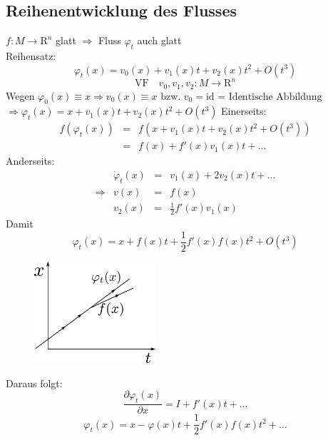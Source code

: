 \documentclass[ngerman]{tudscrreprt}
\begin{document}
\subsection*{Reihenentwicklung des Flusses}
$f: M \to \mathrm{R}^n $ glatt $\Rightarrow$ Fluss $\varphi_t$ auch glatt \\ 
Reihensatz: 
\begin{equation*}
\varphi_t(x) = v_0 (x) + v_1(x)t + v_2(x)t^2 + O(t^3)
\end{equation*}
\begin{equation*}
\text{VF} \quad v_0, v_1, v_2: M \to \mathrm{R}^n
\end{equation*}
Wegen $\varphi_0(x) \equiv x \Rightarrow v_0(x) \equiv x$ bzw. $v_0 = \text{id = Identische Abbildung}$
\\ $\Rightarrow \varphi_t(x) = x + v_1 (x)t + v_2(x)t^2 + O(t^3)  $
Einerseits: \begin{equation*} 
\begin{matrix}
f(\varphi_t(x)) &=& f(x+ v_1(x)t + v_2(x)t^2 + O(t^3)  )\\ 
&=&f(x)+ f'(x) v_1(x) t + \dots   
\end{matrix}
\end{equation*}
Anderseits: \begin{equation*}
\begin{matrix}
&\dot{\varphi}_t(x) &=& v_1(x) + 2v_2(x) t + \dots \\ 
\Rightarrow &v(x) &=& f(x)\\ 
&v_2(x) &=& \frac{1}{2}f'(x) v_1(x)
\end{matrix}
\end{equation*}
Damit \begin{equation*}
\varphi_t(x) = x + f(x) t + \frac{1}{2}f'(x) f(x)t^2 + O(t^3)\tag{2.3}
\end{equation*}
\begin{figure}[H]
\centering
\def\svgwidth{200pt} 
  \includegraphics[width=4.5cm]{image4.pdf}
\end{figure}
Daraus folgt: 
\begin{equation*}
\frac{\partial \varphi_t(x)}{\partial x} = I + f'(x)t + \dots  \tag{2.4}
\end{equation*}
\begin{equation*}
\varphi_t(x) = x - \varphi(x) t + \frac{1}{2}f'(x) f(x) t^2 + \dots  \tag{2.5}
\end{equation*}
\end{document}
